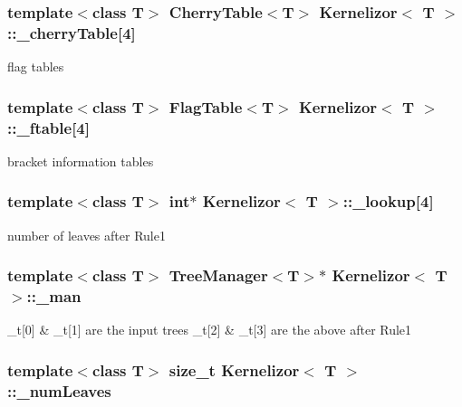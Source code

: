\subsubsection{\setlength{\rightskip}{0pt plus 5cm}template$<$class T$>$ {\bf Cherry\-Table}$<$T$>$ {\bf Kernelizor}$<$ T $>$::{\bf \_\-cherry\-Table}[4]\hspace{0.3cm}{\tt  [protected]}}\label{classKernelizor_p7}


flag tables 

\subsubsection{\setlength{\rightskip}{0pt plus 5cm}template$<$class T$>$ {\bf Flag\-Table}$<$T$>$ {\bf Kernelizor}$<$ T $>$::{\bf \_\-ftable}[4]\hspace{0.3cm}{\tt  [protected]}}\label{classKernelizor_p6}


bracket information tables 

\subsubsection{\setlength{\rightskip}{0pt plus 5cm}template$<$class T$>$ int$\ast$ {\bf Kernelizor}$<$ T $>$::{\bf \_\-lookup}[4]\hspace{0.3cm}{\tt  [protected]}}\label{classKernelizor_p4}


number of leaves after Rule1 

\subsubsection{\setlength{\rightskip}{0pt plus 5cm}template$<$class T$>$ {\bf Tree\-Manager}$<$T$>$$\ast$ {\bf Kernelizor}$<$ T $>$::{\bf \_\-man}\hspace{0.3cm}{\tt  [protected]}}\label{classKernelizor_p1}


\_\-t[0] \& \_\-t[1] are the input trees \_\-t[2] \& \_\-t[3] are the above after Rule1 

\subsubsection{\setlength{\rightskip}{0pt plus 5cm}template$<$class T$>$ size\_\-t {\bf Kernelizor}$<$ T $>$::{\bf \_\-num\-Leaves}\hspace{0.3cm}{\tt  [protected]}}\label{classKernelizor_p2}


